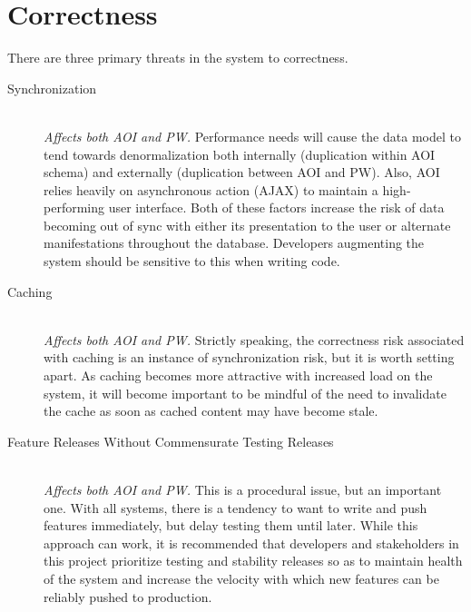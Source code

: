 \documentclass[11pt]{book}
\begin{document}
\section{Correctness}

There are three primary threats in the system to correctness.

\begin{description}
	\item[Synchronization]  \hfill \\
  \emph{Affects both AOI and PW.}  Performance needs will cause the data model to tend towards denormalization both internally (duplication within AOI schema) and externally (duplication between AOI and PW).  Also, AOI relies heavily on asynchronous action (AJAX) to maintain a high-performing user interface.  Both of these factors increase the risk of data becoming out of sync with either its presentation to the user or alternate manifestations throughout the database.  Developers augmenting the system should be sensitive to this when writing code.
  	\item[Caching]  \hfill \\
  \emph{Affects both AOI and PW.}  Strictly speaking, the correctness risk associated with caching is an instance of synchronization risk, but it is worth setting apart.  As caching becomes more attractive with increased load on the system, it will become important to be mindful of the need to invalidate the cache as soon as cached content may have become stale.
    	\item[Feature Releases Without Commensurate Testing Releases]  \hfill \\
  \emph{Affects both AOI and PW.}  This is a procedural issue, but an important one.  With all systems, there is a tendency to want to write and push features immediately, but delay testing them until later.  While this approach can work, it is recommended that developers and stakeholders in this project prioritize testing and stability releases so as to maintain health of the system and increase the velocity with which new features can be reliably pushed to production.
\end{description}


  
 
\end{document}
